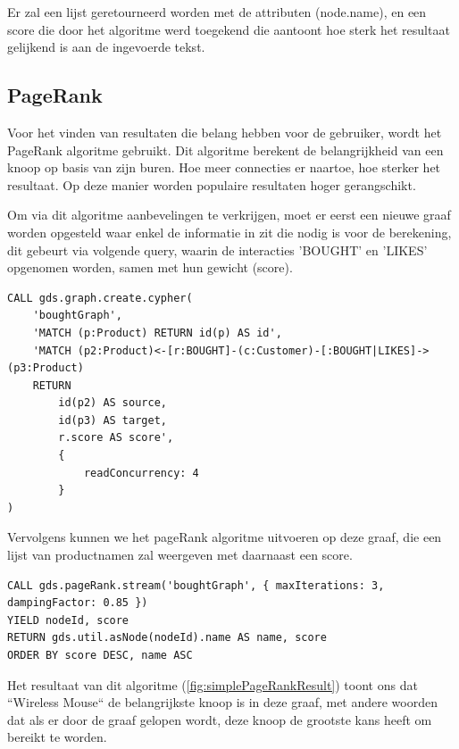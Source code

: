 Er zal een lijst geretourneerd worden met de attributen (node.name), en een score die door het algoritme werd toegekend die aantoont hoe sterk het resultaat gelijkend is aan de ingevoerde tekst.

\subsection{PageRank}
\label{subsec:PageRank}

Voor het vinden van resultaten die belang hebben voor de gebruiker, wordt het PageRank algoritme gebruikt. Dit algoritme berekent de belangrijkheid van een knoop op basis van zijn buren. Hoe meer connecties er naartoe, hoe sterker het resultaat. Op deze manier worden populaire resultaten hoger gerangschikt.

Om via dit algoritme aanbevelingen te verkrijgen, moet er eerst een nieuwe graaf worden opgesteld waar enkel de informatie in zit die nodig is voor de berekening, dit gebeurt via volgende query, waarin de interacties 'BOUGHT' en 'LIKES' opgenomen worden, samen met hun gewicht (score).

\begin{lstlisting}[caption={Een genoemde graaf creëren om graafalgoritmen op uit te voeren}]
CALL gds.graph.create.cypher(
	'boughtGraph',
	'MATCH (p:Product) RETURN id(p) AS id',
	'MATCH (p2:Product)<-[r:BOUGHT]-(c:Customer)-[:BOUGHT|LIKES]->(p3:Product)
	RETURN
		id(p2) AS source,
		id(p3) AS target,
		r.score AS score',
		{
			readConcurrency: 4
		}
)
\end{lstlisting}

Vervolgens kunnen we het pageRank algoritme uitvoeren op deze graaf, die een lijst van productnamen zal weergeven met daarnaast een score.

\begin{lstlisting}[caption={PageRank algoritme uitvoeren}]
CALL gds.pageRank.stream('boughtGraph', { maxIterations: 3, dampingFactor: 0.85 })
YIELD nodeId, score
RETURN gds.util.asNode(nodeId).name AS name, score
ORDER BY score DESC, name ASC
\end{lstlisting}

Het resultaat van dit algoritme (\autoref{fig:simplePageRankResult}) toont ons dat ``Wireless Mouse`` de belangrijkste knoop is in deze graaf, met andere woorden dat als er door de graaf gelopen wordt, deze knoop de grootste kans heeft om bereikt te worden. 

